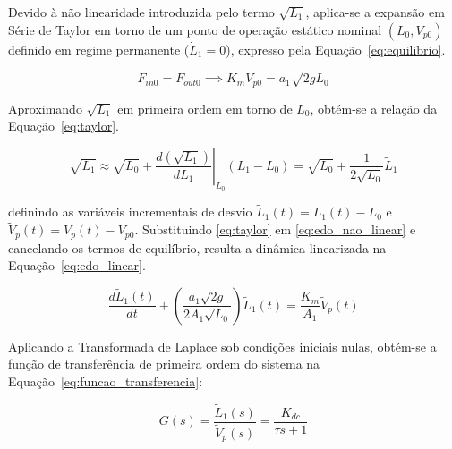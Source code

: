 \documentclass[a4paper,12pt]{article}
\begin{document}
\begin{justify}
    \hspace{4ex}Devido à não linearidade introduzida pelo termo $\sqrt{L_1}$, aplica-se a expansão em Série de Taylor em torno de um ponto de operação estático nominal $(L_0, V_{p0})$ definido em regime permanente ($\dot{L}_1 = 0$), expresso pela Equação~\eqref{eq:equilibrio}.
\end{justify}

\begin{equation}
    F_{in0} = F_{out0} \implies K_m V_{p0} = a_1 \sqrt{2g L_0}
    \label{eq:equilibrio}
\end{equation}

\begin{justify}
    \hspace{4ex}Aproximando $\sqrt{L_1}$ em primeira ordem em torno de $L_0$, obtém-se a relação da Equação~\eqref{eq:taylor}.
\end{justify}

\begin{equation}
    \sqrt{L_1} \approx \sqrt{L_0} + \left. \frac{d(\sqrt{L_1})}{dL_1} \right|_{L_0} (L_1 - L_0) = \sqrt{L_0} + \frac{1}{2\sqrt{L_0}} \tilde{L}_1
    \label{eq:taylor}
\end{equation}

\begin{justify}
    \noindent definindo as variáveis incrementais de desvio $\tilde{L}_1(t) = L_1(t) - L_0$ e $\tilde{V}_p(t) = V_p(t) - V_{p0}$. Substituindo \eqref{eq:taylor} em \eqref{eq:edo_nao_linear} e cancelando os termos de equilíbrio, resulta a dinâmica linearizada na Equação~\eqref{eq:edo_linear}.
\end{justify}

\begin{equation}
    \frac{d\tilde{L}_1(t)}{dt} + \left( \frac{a_1 \sqrt{2g}}{2 A_1 \sqrt{L_0}} \right) \tilde{L}_1(t) = \frac{K_m}{A_1} \tilde{V}_p(t)
    \label{eq:edo_linear}
\end{equation}

\begin{justify}
    \hspace{4ex}Aplicando a Transformada de Laplace sob condições iniciais nulas, obtém-se a função de transferência de primeira ordem do sistema na Equação~\eqref{eq:funcao_transferencia}:
\end{justify}

\begin{equation}
    G(s) = \frac{\tilde{L}_1(s)}{\tilde{V}_p(s)} = \frac{K_{dc}}{\tau s + 1}
    \label{eq:funcao_transferencia}
\end{equation}
\end{document}
